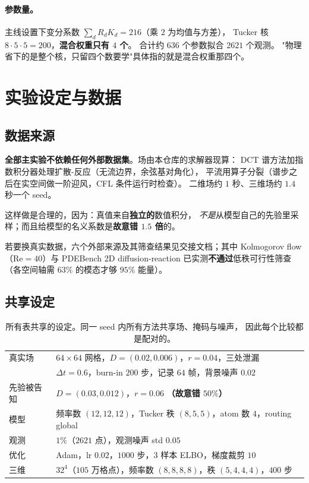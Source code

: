 \documentclass[11pt,a4paper]{article}
\begin{document}
\paragraph{参数量。}主线设置下变分系数 $\sum_d R_d K_d = 216$（乘 $2$ 为均值与方差），
Tucker 核 $8 \cdot 5 \cdot 5 = 200$，\textbf{混合权重只有 $4$ 个}。
合计约 $636$ 个参数拟合 $2621$ 个观测。
"物理省下的是整个核，只留四个数要学"具体指的就是混合权重那四个。

\section{实验设定与数据}

\subsection{数据来源}

\textbf{全部主实验不依赖任何外部数据集}。场由本仓库的求解器现算：
DCT 谱方法加指数积分器处理扩散-反应（无流边界，余弦基对角化），
平流用算子分裂（谱步之后在实空间做一阶迎风，CFL 条件运行时检查）。
二维场约 $1$ 秒、三维场约 $1.4$ 秒一个 seed。

这样做是合理的，因为：真值来自\textbf{独立的}数值积分，
\emph{不是}从模型自己的先验里采样；而且给模型的名义系数是\textbf{故意错 $1.5$ 倍}的。

若要换真实数据，六个外部来源及其筛查结果见交接文档；其中
Kolmogorov flow（$\mathrm{Re}=40$）与 PDEBench 2D diffusion-reaction
已实测\textbf{不通过}低秩可行性筛查（各空间轴需 $63\%$ 的模态才够 $95\%$ 能量）。

\subsection{共享设定}

\begin{table}[t]
\centering
\caption{所有表共享的设定。同一 seed 内所有方法共享场、掩码与噪声，
因此每个比较都是配对的。}
\label{tab:settings}
\begin{tabular}{ll}
\toprule
真实场 & $64\times64$ 网格，$D=(0.02, 0.006)$，$r=0.04$，三处泄漏 \\
       & $\Delta t = 0.6$，burn-in $200$ 步，记录 $64$ 帧，背景噪声 $0.02$ \\
先验被告知 & $D = (0.03, 0.012)$，$r = 0.06$ \quad\textbf{（故意错 $50\%$）} \\
模型 & 频率数 $(12,12,12)$，Tucker 秩 $(8,5,5)$，atom 数 $4$，routing global \\
观测 & $1\%$（$2621$ 点），观测噪声 std $0.05$ \\
优化 & Adam，lr $0.02$，$1000$ 步，$3$ 样本 ELBO，梯度裁剪 $10$ \\
三维 & $32^4$（$105$ 万格点），频率数 $(8,8,8,8)$，秩 $(5,4,4,4)$，$400$ 步 \\
\bottomrule
\end{tabular}
\end{table}
\end{document}
